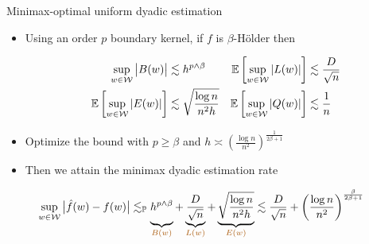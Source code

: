 \documentclass{beamer}
\begin{document}
\begin{frame}{Minimax-optimal uniform dyadic estimation}

  \vspace*{2mm}
  \begin{itemize}
    \item Using an order $p$ boundary kernel,
      if $f$ is $\beta$-H{\"o}lder then

      \vspace*{-4mm}
      \begin{align*}
        \sup_{w \in \mathcal{W}} \big| B(w) \big|
        &\lesssim h^{p\wedge\beta}
        &\mathbb{E}\left[ \sup_{w \in \mathcal{W}} |L(w)| \right]
        &\lesssim
        \frac{D}{\sqrt n} \\
        \mathbb{E}\left[ \sup_{w \in \mathcal{W}} |E(w)| \right]
        &\lesssim \sqrt{\frac{\log n}{n^2h}}
        &\mathbb{E}\left[ \sup_{w \in \mathcal{W}} |Q(w)| \right]
        &\lesssim \frac{1}{n}
      \end{align*}

    \item
      Optimize the bound with $p \geq \beta$ and
      $h \asymp \left( \frac{\log n}{n^2} \right)^{\frac{1}{2 \beta + 1}}$

    \item Then we attain the minimax dyadic estimation rate
  \end{itemize}

  \vspace*{3mm}

  \begin{theorem}
    \vspace*{-3mm}
    \small{
      \begin{align*}
        \sup_{w \in \cW}
        \big|\hat f(w) - f(w)\big|
        &\lesssim_\P
        \underbrace{h^{p \wedge \beta}\vphantom{\frac{D}{\sqrt n}}
        }_{\textcolor{alertcolor}{B(w)}}
        + \underbrace{\frac{D}{\sqrt n}
        }_{\textcolor{alertcolor}{L(w)}}
        + \underbrace{\sqrt{\frac{\log n}{n^2h}}\vphantom{\frac{D}{\sqrt n}}
        }_{\textcolor{alertcolor}{E(w)}}
        \lesssim
        \frac{D}{\sqrt n}
        + \left( \frac{\log n}{n^2} \right)^{\frac{\beta}{2\beta + 1}}
      \end{align*}
    }
    \vspace*{-4mm}
  \end{theorem}

\end{frame}
\end{document}
